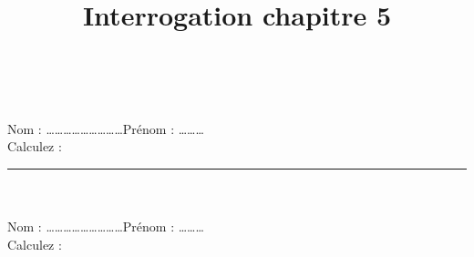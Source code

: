 \documentclass[14 pt]{extarticle}
\title{Interrogation chapitre 5}
\date{}
\theoremstyle{plain}
\newcommand{\exo}[6]{
 \ \\ \ \\
 Nom : \ldots\ldots\ldots\ldots\ldots\ldots\ldots\ldots\ldots Prénom : \ldots\ldots\ldots \\ 
 Calculez :
  }
\begin{document}
 
 \exo
 \[\ ]
 \hrule
 \exo
 
 \[ \]
 \hrule\exo 
 
 \[ \] 
 \hrule\exo 
 
 \[ \] 
 
 
 	
\end{document}
